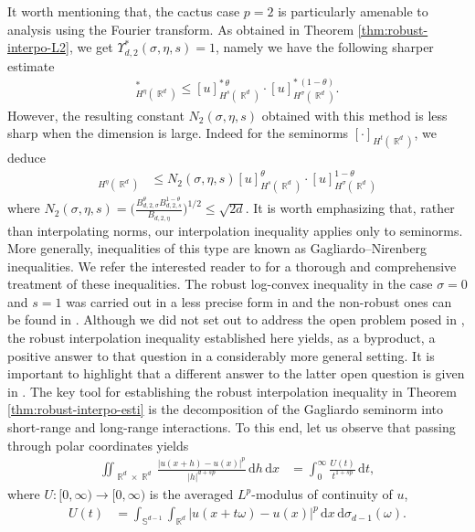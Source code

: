 \documentclass[12pt, reqno]{amsart}%
\theoremstyle{plain}  %
\theoremstyle{definition}  %
\theoremstyle{remark}
\numberwithin{equation}{section}
\DeclareMathOperator{\R}{\mathbb{R}}
\renewcommand{\d}{\,\mathrm{d}}
\begin{document}
\noindent It worth mentioning that, the cactus case $p = 2$ is particularly amenable to analysis using the Fourier transform. As obtained in  Theorem \ref{thm:robust-interpo-L2}, we get  $\Upsilon^*_{d,2}(\sigma,\eta, s)=1$, namely we have the following sharper estimate
\begin{align*}
[u]^*_{H^\eta (\R^d)}\leq[u]^{*\,\theta}_{H^s (\R^d)} \cdot  [u]^{*\,(1-\theta)}_{H^\sigma(\R^d)}.
\end{align*}
However, the resulting constant $N_2(\sigma, \eta, s)$ obtained with this method is less sharp when the dimension is large. Indeed  for  the seminorms $[\cdot ]_{H^t (\R^d)}$, we deduce
\begin{align*}
[u]_{H^\eta (\R^d)}
&\leq N_2(\sigma, \eta, s)[u]_{H^s (\R^d)}^{\theta}  \cdot [u]_{H^\sigma(\R^d)}^{1-\theta}
\end{align*}
 where $N_2(\sigma, \eta, s) =\big(\tfrac{B_{d,2,\sigma}^{\theta}B_{d,2,s}^{1-\theta}}{B_{d,2,\eta}} \big)^{1/2}\leq \sqrt{2d}.$
It is worth emphasizing that, rather than interpolating norms, our interpolation inequality applies only to seminorms. More generally, inequalities of this type are known as Gagliardo–Nirenberg inequalities. We refer the interested reader to \cite{BM18} for a thorough and comprehensive treatment of these inequalities. The robust log-convex inequality in the case $\sigma = 0$ and $s = 1$ was carried out in a less precise form in \cite[Theorem 3.54]{guy-thesis} and the non-robust ones can be found in \cite[Chapter 7]{Leo23}.
Although we did not set out  to address the open problem posed in \cite[Question 1.10]{BSY22}, the robust interpolation inequality established here yields, as a byproduct, a positive answer to that question in a considerably more general setting. It is important to highlight that a different answer to the latter open question is given in \cite[Theorem 3.9]{DoMi23}.
The key tool for establishing the robust interpolation inequality in Theorem \ref{thm:robust-interpo-esti} is the decomposition of the Gagliardo seminorm into short-range and long-range interactions. To this end, let us observe that passing through polar coordinates yields
\begin{align*}
\iint_{\R^d \times \R^d} \frac{ |u(x + h) - u(x)|^p}{|h|^{d+s p}}\d h\d x
&= \int_0^\infty   \frac{U(t) }{t^{1+s p}}\d t,
\end{align*}
where $U:[0,\infty)\to [0,\infty)$ is the averaged $L^p$-modulus of continuity of $u$,
\begin{align*}
U(t) &= \int_{\mathbb{S}^{d-1}} \int_{\R^d} |u(x + t\omega) - u(x)|^p \d x \d\sigma_{d-1}(\omega).
\end{align*}
\end{document}
